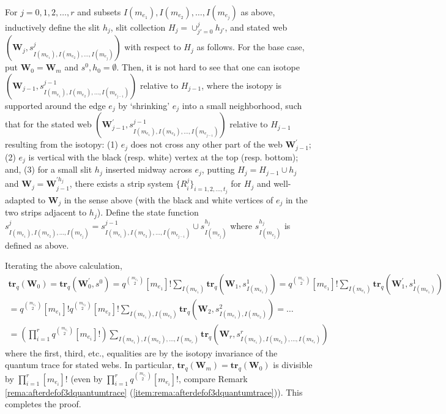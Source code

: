 \documentclass[12pt, reqno]{amsart}
\theoremstyle{definition}
\newcommand{\trq}{\mathbf{tr}_q}%
\begin{document}
For $j=0,1,2,\dots,r$ and subsets $I(m_{e_1}), I(m_{e_2}), \dots, I(m_{e_j})$ as above, inductively define the slit $h_j$, slit collection $H_j=\cup_{j'=0}^j h_{j'}$, and stated web $(\mathbf{W}_j,s^j_{I(m_{e_1}), I(m_{e_2}), \dots, I(m_{e_j})})$ with respect to $H_j$ as follows.  For the base case, put $\mathbf{W}_0=\mathbf{W}_m$ and $s^0, h_0=\emptyset$.  Then, it is not hard to see that one can isotope $(\mathbf{W}_{j-1},s^{j-1}_{I(m_{e_1}), I(m_{e_2}), \dots, I(m_{e_{j-1}})})$ relative to $H_{j-1}$, where the isotopy is supported around the edge $e_j$ by `shrinking' $e_j$ into a small neighborhood, such that for the stated web $(\mathbf{W}^\prime_{j-1},s^{j-1}_{I(m_{e_1}), I(m_{e_2}), \dots, I(m_{e_{j-1}})})$ relative to $H_{j-1}$ resulting from the isotopy:  (1)  $e_j$ does not cross any other part of the web $\mathbf{W}^\prime_{j-1}$;  (2)  $e_j$ is vertical with the black (resp. white) vertex at the top (resp. bottom);  and, (3)  for a small slit $h_j$ inserted midway across $e_j$, putting $H_j=H_{j-1}\cup h_j$ and $\mathbf{W}_j=\mathbf{W}_{j-1}^{\prime h_j}$, there exists a strip system $\{R^j_i\}_{i=1,2,\dots,t_j}$ for $H_j$ and well-adapted to $\mathbf{W}_j$ in the sense above (with the black and white vertices of $e_j$ in the two strips adjacent to $h_j$).  Define the state function $s^j_{I(m_{e_1}), I(m_{e_2}), \dots, I(m_{e_j})}=s^{j-1}_{I(m_{e_1}), I(m_{e_2}), \dots, I(m_{e_{j-1}})}\cup s^{h_j}_{I(m_{e_j})}$ where $s^{h_j}_{I(m_{e_j})}$ is defined as above.  

Iterating the above calculation, 
\begin{gather*}
\trq(\mathbf{W}_0)
=\trq(\mathbf{W}^\prime_0,s^0)
=q^{\binom{m_{e_1}}{2}}[m_{e_1}]!\sum_{I(m_{e_1})}\trq(\mathbf{W}_1,s^1_{I(m_{e_1})})
=q^{\binom{m_{e_1}}{2}}[m_{e_1}]!\sum_{I(m_{e_1})}\trq(\mathbf{W}^\prime_1,s^1_{I(m_{e_1})})
\\=q^{\binom{m_{e_1}}{2}}[m_{e_1}]!q^{\binom{m_{e_2}}{2}}[m_{e_2}]!\sum_{I(m_{e_1}), I(m_{e_2})}\trq(\mathbf{W}_2,s^2_{I(m_{e_1}), I(m_{e_2})})
=\dots
\\=
\left(\prod_{i=1}^r q^{\binom{m_{e_i}}{2}}[m_{e_i}]!\right)\sum_{I(m_{e_1}), I(m_{e_2}), \dots, I(m_{e_r})}\trq(\mathbf{W}_r,s^r_{I(m_{e_1}), I(m_{e_2}), \dots, I(m_{e_r})})
\end{gather*}
where the first, third, etc., equalities are by the isotopy invariance of the quantum trace for stated webs.  In particular, $\trq(\mathbf{W}_m)=\trq(\mathbf{W}_0)$ is divisible by $\prod_{i=1}^r [m_{e_i}]!$ (even by $\prod_{i=1}^r q^{\binom{m_{e_i}}{2}}[m_{e_i}]!$, compare Remark \ref{rema:afterdefof3dquantumtrace} (\ref{item:rema:afterdefof3dquantumtrace})).  This completes the proof.  
\end{document}
